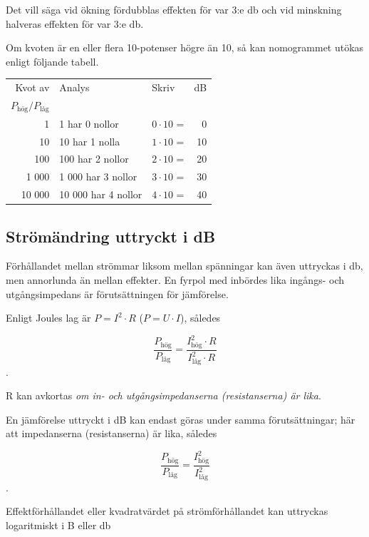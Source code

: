 Det vill säga vid ökning fördubblas effekten för var 3:e \unit{\decibel} och vid
minskning halveras effekten för var 3:e \unit{\decibel}.

Om kvoten är en eller flera 10-potenser högre än 10, så kan nomogrammet utökas
enligt följande tabell.

\begin{center}
\begin{tabular}{rllr}
Kvot av & Analys             & Skriv            & dB \\
\(P_{\text{hög}}/P_{\text{låg}}\) &          &                  &    \\
     1 & 1 har 0 nollor      & \(0 \cdot 10\) = &  0 \\
    10 & 10 har 1 nolla      & \(1 \cdot 10\) = & 10 \\
   100 & 100 har 2 nollor    & \(2 \cdot 10\) = & 20 \\
 1 000 &  1 000 har 3 nollor & \(3 \cdot 10\) = & 30 \\
10 000 & 10 000 har 4 nollor & \(4 \cdot 10\) = & 40
\end{tabular}
\end{center}

\subsection{Strömändring uttryckt i dB}

Förhållandet mellan strömmar liksom mellan spänningar kan även uttryckas i
\unit{\decibel}, men annorlunda än mellan effekter.
En fyrpol med inbördes lika ingångs- och utgångsimpedans är förutsättningen för
jämförelse.

Enligt Joules lag är \(P = I^2 \cdot R\) (\(P = U \cdot I\)), således

\[\dfrac{P_{\text{hög}}}{P_{\text{låg}}} = \dfrac{I_{\text{hög}}^2 \cdot R}{I_{\text{låg}}^2 \cdot R}\].

R kan avkortas \emph{om in- och utgångsimpedanserna (resistanserna) är lika}.

En jämförelse uttryckt i dB kan endast göras under samma förutsättningar;
här att impedanserna (resistanserna) är lika, således

\[\dfrac{P_{\text{hög}}}{P_{\text{låg}}} = \dfrac{I_{\text{hög}}^2}{I_{\text{låg}}^2}\].

Effektförhållandet eller kvadratvärdet på strömförhållandet kan uttryckas
logaritmiskt i B eller \unit{\decibel}

